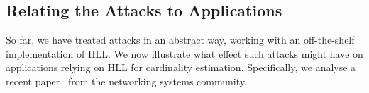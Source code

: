 \documentclass[sigconf, anonymous, dvipsnames]{acmart} %
\begin{document}
\begin{table*}[tb!]
\small\centering
\caption{Attack results, averaged over 30 iterations, in the setting of~\cite{hllvuln}.}
\medskip
\label{table:tab2}
\end{table*}


\subsection{Relating the Attacks to Applications}\label{sec:exp-apps}

So far, we have treated attacks in an abstract way, working with an off-the-shelf implementation of HLL. We now illustrate what effect such attacks might have on applications relying on HLL for cardinality estimation. Specifically, we analyse a recent paper~\cite{flexswitch} from the networking systems community.
\end{document}
